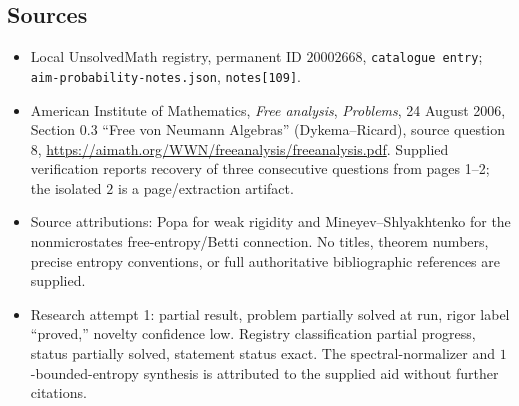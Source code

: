 \documentclass[11pt]{article}
\begin{document}
\subsection{Sources}
\begin{itemize}
\item Local UnsolvedMath registry, permanent ID $20002668$, \texttt{catalogue entry}; \texttt{aim-probability-notes.json}, \texttt{notes[109]}.
\item American Institute of Mathematics, \emph{Free analysis}, \emph{Problems}, 24 August 2006, Section 0.3 ``Free von Neumann Algebras'' (Dykema--Ricard), source question 8, \url{https://aimath.org/WWN/freeanalysis/freeanalysis.pdf}. Supplied verification reports recovery of three consecutive questions from pages 1--2; the isolated $2$ is a page/extraction artifact.
\item Source attributions: Popa for weak rigidity and Mineyev--Shlyakhtenko for the nonmicrostates free-entropy/Betti connection. No titles, theorem numbers, precise entropy conventions, or full authoritative bibliographic references are supplied.
\item Research attempt 1: partial result, problem partially solved at run, rigor label ``proved,'' novelty confidence low. Registry classification partial progress, status partially solved, statement status exact. The spectral-normalizer and $1$-bounded-entropy synthesis is attributed to the supplied aid without further citations.
\end{itemize}
\end{document}
